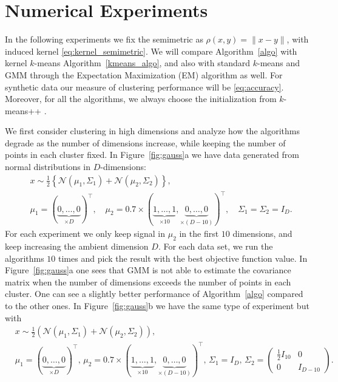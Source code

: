 \documentclass[aps,preprint,nofootinbib,floatfix]{revtex4-1}
\begin{document}
\section{Numerical Experiments}
\label{sec:numerics}

In the following experiments we fix the semimetric as $\rho(x,y) = \| x-y\|$,
with induced kernel 
\eqref{eq:kernel_semimetric}. We will compare Algorithm~\ref{algo} with
kernel $k$-means Algorithm~\ref{kmeans_algo}, and also with
standard $k$-means and GMM through the Expectation Maximization (EM) algorithm
as well. For synthetic data our measure of clustering performance
will be \eqref{eq:accuracy}. Moreover, for all the algorithms, we always
choose the initialization from $k$-means++ \cite{Vassilvitskii}.

We first consider clustering in high dimensions and analyze 
how the algorithms degrade as the number of dimensions increase, while
keeping the number of points in each cluster fixed. 
In Figure~\ref{fig:gauss}a we have data generated from normal 
distributions in 
$D$-dimensions:
\begin{equation}
\label{eq:gauss1}
\begin{split}
&x \sim \tfrac{1}{2}\left\{ 
\mathcal{N}(\mu_1,\Sigma_1) + \mathcal{N}(\mu_2, \Sigma_2)\right\}, \\
&\mu_1 = (\underbrace{0,\dotsc,0}_{\times D})^\top , \quad
\mu_2 = 0.7 \times (\underbrace{1,\dots,1}_{\times 10},
\underbrace{0,\dots,0}_{\times (D-10)})^\top, \quad
\Sigma_1 = \Sigma_2 = I_D.
\end{split}
\end{equation}
For each experiment we only keep signal in
$\mu_2$ in the first $10$
dimensions, and keep increasing the ambient dimension $D$. For each
data set, we run the algorithms $10$ times and pick the result with
the best objective function value.
In Figure~\ref{fig:gauss}a one sees that
GMM is not able to estimate the covariance matrix 
when the number
of dimensions exceeds the number of points in each cluster. 
One can see a slightly better performance of Algorithm~\ref{algo} compared
to the other ones.
In Figure~\ref{fig:gauss}b we have the same type of experiment but 
with 
\begin{equation}
\label{eq:gauss2}
\begin{split}
&x \sim \tfrac{1}{2}\left( 
\mathcal{N}(\mu_1,\Sigma_1) + \mathcal{N}(\mu_2, \Sigma_2)\right), \\
&\mu_1 = (\underbrace{0,\dotsc,0}_{\times D})^\top , \,
\mu_2 = 0.7 \times (\underbrace{1,\dots,1}_{\times 10},
\underbrace{0,\dots,0}_{\times (D-10)})^\top, \,
\Sigma_1 = I_D, \, 
\Sigma_2 = \left( \begin{smallmatrix} \tfrac{1}{2} I_{10} & 0 \\ 0 & I_{D-10}
\end{smallmatrix}\right). \quad
\end{split}
\end{equation}
\end{document}
